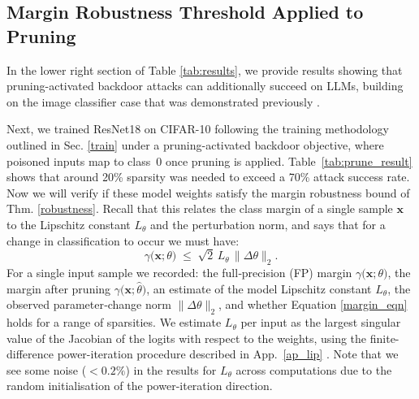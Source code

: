 \documentclass{article}
\newcommand{\cmark}{\textcolor{green!60!black}{\ding{51}}}
\newcommand{\xmark}{\textcolor{red!60!black}{\ding{55}}}
\newcommand{\good}{\cellcolor{green!15}\makebox[1.0em][c]{\cmark}}
\newcommand{\bad}{\cellcolor{red!15}\makebox[1.0em][c]{\xmark}}
\theoremstyle{plain}
\theoremstyle{definition}
\theoremstyle{remark}
\begin{document}
\subsection{Margin Robustness Threshold Applied to Pruning}\label{example}
In the lower right section of Table \ref{tab:results}, we provide results showing that pruning-activated backdoor attacks can additionally succeed on LLMs,  building on the image classifier case that was demonstrated previously \cite{tian_stealthy_2021}.

Next, we trained ResNet18 on CIFAR-10 following the training methodology outlined in Sec. \ref{train} under a pruning-activated backdoor objective, where poisoned inputs map to class~0 once pruning is applied. Table~\ref{tab:prune_result} shows that around 20\% sparsity was needed to exceed a 70\% attack success rate.  Now we will verify if these model weights satisfy the margin robustness bound of Thm. \ref{robustness}. Recall that this relates the class margin of a single sample $\mathbf{x}$ to the Lipschitz constant $L_\theta$ and the perturbation norm, and says that for a change in classification to occur we must have:
\begin{equation}\label{margin_eqn}
\gamma \bigl(\mathbf x; \theta\bigr) \;\le\; \sqrt{2}\,L_\theta\,\|\Delta\theta\|_2.
\end{equation}
For a single input sample we recorded: the full‐precision (FP) margin \(\gamma \bigl(\mathbf x; \theta\bigr)\), the margin after pruning $\gamma \bigl(\mathbf x; \hat{\theta}\bigr)$, an estimate of the model Lipschitz constant \(L_{\theta}\), the observed parameter‐change norm \(\|\Delta\theta\|_{2}\), and whether Equation \ref{margin_eqn} holds for a range of sparsities.  We estimate $L_\theta$ per input as the largest singular value of the Jacobian of the logits with respect to the weights, using the finite-difference power-iteration procedure  described in App.~\ref{ap_lip} \cite{golub_matrix_1996, pearlmutter_fast_1994}. Note that we see some noise ($<0.2\%$) in the results for $L_\theta$ across computations due to the random initialisation of the power-iteration direction.
\end{document}
